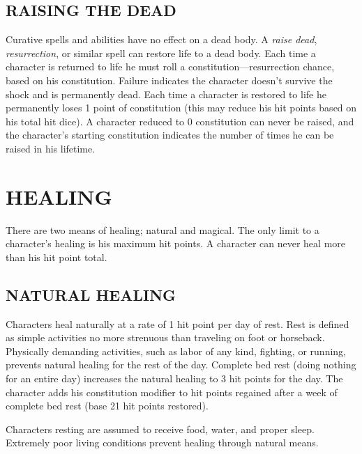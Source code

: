 \begin{multicols}{2}
\subsection{RAISING THE DEAD}

Curative spells and abilities have no effect on a dead body.  A \textit{raise dead}, \textit{resurrection}, or similar spell can restore life to a dead body.  Each time a character is returned to life he must roll a constitution---resurrection chance, based on his constitution.  Failure indicates the character doesn't survive the shock and is permanently dead.  Each time a character is restored to life he permanently loses 1 point of constitution (this may reduce his hit points based on his total hit dice).  A character reduced to 0 constitution can never be raised, and the character's starting constitution indicates the number of times he can be raised in his lifetime.

\section{HEALING}

There are two means of healing; natural and magical.  The only limit to a character's healing is his maximum hit points.  A character can never heal more than his hit point total.

\subsection{NATURAL HEALING}

Characters heal naturally at a rate of 1 hit point per day of rest.  Rest is defined as simple activities no more strenuous than traveling on foot or horseback.  Physically demanding activities, such as labor of any kind, fighting, or running, prevents natural healing for the rest of the day.  Complete bed rest (doing nothing for an entire day) increases the natural healing to 3 hit points for the day.  The character adds his constitution modifier to hit points regained after a week of complete bed rest (base 21 hit points restored).  

Characters resting are assumed to receive food, water, and proper sleep.  Extremely poor living conditions prevent healing through natural means.

\end{multicols}

